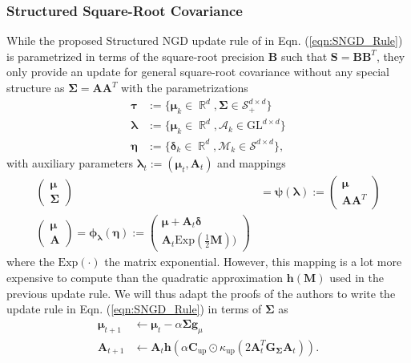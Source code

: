 \documentclass[a4paper, 11pt, oneside]{scrartcl}
\theoremstyle{break}
\DeclareMathOperator{\Real}{\mathbb{R}}
\newcommand{\matr}[1]{\boldsymbol{#1}}
\newcommand{\set}[1]{\mathcal{#1}}
\numberwithin{equation}{section}
\begin{document}
			\subsubsection{Structured Square-Root Covariance}
				While the proposed Structured NGD update rule of \parencite{LNK+21} in Eqn. (\ref{eqn:SNGD_Rule}) is parametrized in terms of the square-root precision $\matr{B}$ such that $\matr{S} = \matr{B} \matr{B}^T$, they only provide an update for general square-root covariance without any special structure as $\matr{\Sigma} = \matr{A} \matr{A}^T$ with the parametrizations 
				\begin{align*}
					\matr{\tau} &:= \{\matr{\mu}_k \in \Real^d, \matr{\Sigma} \in \set{S}_+^{d \times d}\} \\
					\matr{\lambda} &:= \{\matr{\mu}_k \in \Real^d, \set{A}_k \in \text{GL}^{d \times d} \} \\
					\matr{\eta} &:= \{\matr{\delta}_k \in \Real^d, \set{M}_k \in \set{S}^{d \times d} \},
				\end{align*}
				with auxiliary parameters $\matr{\lambda}_t := (\matr{\mu}_t, \matr{A}_t)$ and mappings 
				\begin{align*}
					\begin{pmatrix} \matr{\mu} \\ \matr{\Sigma} \end{pmatrix} &= \matr{\psi}(\matr{\lambda}) := \begin{pmatrix} \matr{\mu} \\ \matr{A} \matr{A}^T \end{pmatrix} \\
					\begin{pmatrix} \matr{\mu} \\ \matr{A} \end{pmatrix} = \matr{\phi}_{\matr{\lambda}} (\matr{\eta}) := \begin{pmatrix} \matr{\mu} + \matr{A}_t \matr{\delta} \\ \matr{A}_t \text{Exp}(\frac{1}{2} \matr{M})) \end{pmatrix}
				\end{align*}
				where the $\text{Exp} ( \cdot )$ the matrix exponential. 
				However, this mapping is a lot more expensive to compute than the quadratic approximation $\matr{h} (\matr{M})$ used in the previous update rule. 
				We will thus adapt the proofs of the authors to write the update rule in Eqn. (\ref{eqn:SNGD_Rule}) in terms of $\matr{\Sigma}$ as 
				\begin{equation}
					\begin{aligned}
						\matr{\mu}_{t+1} &\leftarrow \matr{\mu}_t - \alpha \matr{\Sigma} \matr{g}_{\mu} \\
						\matr{A}_{t+1} &\leftarrow \matr{A}_t \matr{h} (\alpha \matr{C}_{\text{up}} \odot \kappa_{\text{up}} (2 \matr{A}_t^T \matr{G}_{\matr{\Sigma}} \matr{A}_t)).
					\end{aligned}
				\end{equation}
\end{document}
